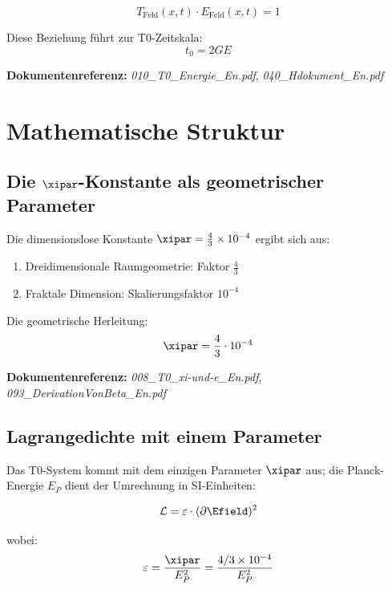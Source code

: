 \begin{equation}
	T_{\text{Feld}}(x,t) \cdot E_{\text{Feld}}(x,t) = 1
\end{equation}

Diese Beziehung führt zur T0-Zeitskala:
\begin{equation}
	t_0 = 2GE
\end{equation}

\textbf{Dokumentenreferenz:} \textit{010\_T0\_Energie\_En.pdf}, \textit{040\_Hdokument\_En.pdf}

\section{Mathematische Struktur}

\subsection{Die $\xipar$-Konstante als geometrischer Parameter}

Die dimensionslose Konstante $\xipar = \frac{4}{3} \times 10^{-4}$ ergibt sich aus:

\begin{enumerate}
	\item Dreidimensionale Raumgeometrie: Faktor $\frac{4}{3}$
	\item Fraktale Dimension: Skalierungsfaktor $10^{-4}$
\end{enumerate}

Die geometrische Herleitung:
\begin{equation}
	\xipar = \frac{4}{3} \cdot 10^{-4}
\end{equation}

\textbf{Dokumentenreferenz:} \textit{008\_T0\_xi-und-e\_En.pdf}, \textit{093\_DerivationVonBeta\_En.pdf}

\subsection{Lagrangedichte mit einem Parameter}

Das T0-System kommt mit dem einzigen Parameter $\xipar$ aus; die Planck-Energie $E_P$ dient der Umrechnung in SI-Einheiten:

\begin{equation}
	\mathcal{L} = \varepsilon \cdot (\partial \Efield)^2
\end{equation}

wobei:
\begin{equation}
	\varepsilon = \frac{\xipar}{E_P^2} = \frac{4/3 \times 10^{-4}}{E_P^2}
\end{equation}

